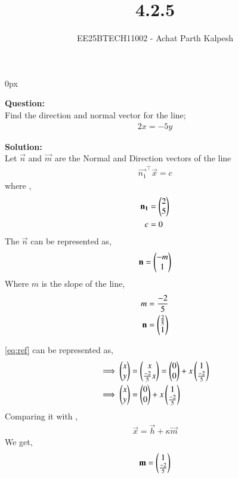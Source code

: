 \documentclass[journal]{IEEEtran}
\begin{document}

\title{4.2.5}
\author{EE25BTECH11002 - Achat Parth Kalpesh }
{\let\newpage\relax\maketitle}
\renewcommand{\thefigure}{\theenumi}
\renewcommand{\thetable}{\theenumi}
\setlength{\intextsep}{10pt} %
\renewcommand{\thetable}{\theenumi}
\parindent 0px


\textbf{Question:}\\
Find the direction and normal vector for the line;
\begin{align}
    2x=-5y
    \label{eq:ref}
\end{align}

\textbf{Solution:}\\
Let $\vec{n}$ and $\vec{m}$ are the Normal and Direction vectors of the 
line
\begin{align}
    \vec{n_1}^\top\vec{x}=c
\end{align}
where ,
\begin{align}
    \mathbf{n_1} &= \begin{pmatrix}2 \\ 5\end{pmatrix}\\
    c &= 0
\end{align}
The $\vec{n}$ can be represented as,
\begin{align}
    \mathbf{n} = \begin{pmatrix}-m \\ 1\end{pmatrix}
\end{align}
Where $m$ is the slope of the line,
\begin{align}
    m &= \frac{-2}{5}\\
    \mathbf{n} &= \begin{pmatrix}\frac{2}{5} \\ 1\end{pmatrix}
\end{align}

\eqref{eq:ref} can be represented as,
\begin{align}
    \implies \begin{pmatrix}x \\ y\end{pmatrix} &= \begin{pmatrix}x \\ \frac{-2}{5}x\end{pmatrix} =\begin{pmatrix}0 \\ 0\end{pmatrix} + x\begin{pmatrix}1 \\ \frac{-2}{5}\end{pmatrix}\\
    \implies \begin{pmatrix}x \\ y\end{pmatrix} &=\begin{pmatrix}0 \\ 0\end{pmatrix} + x\begin{pmatrix}1 \\ \frac{-2}{5}\end{pmatrix}
\end{align}
Comparing it with ,
\begin{align}
\label{eq:geo-param}
	\vec{x} = \vec{h} + \kappa \vec{m}
\end{align}
We get,
\begin{align}
			\label{eq:line-school-dir}
\mathbf{m} = \begin{pmatrix}1 \\ \frac{-2}{5}\end{pmatrix}
\end{align}
\end{document}
